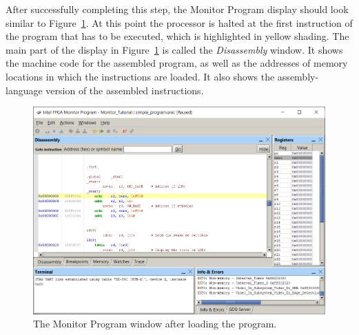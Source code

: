 \documentclass[11pt, twoside, pdftex]{article}
\begin{document}
After successfully completing this step, the Monitor Program display should look similar to Figure~\ref{fig:13}. At this point the
processor is halted at the first instruction of the program that
has to be executed, which is highlighted in yellow shading.
The main part of the display in Figure~\ref{fig:13} is called the
{\it Disassembly} window. 
It shows the machine code for the assembled program,
as well as the addresses of memory locations in which the
instructions are loaded. It also shows the assembly-language
version of the assembled instructions.

\begin{figure}[H]
   \begin{center}
      \includegraphics[scale=.57]{screenshots/figure13.png}
   \end{center}
   \caption{The Monitor Program window after loading the program.} 
	 \label{fig:13}
\end{figure}
\end{document}

